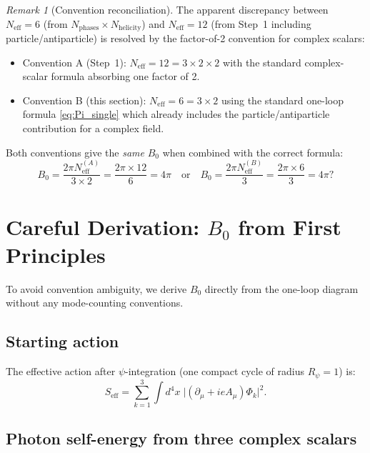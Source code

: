 \documentclass[12pt,a4paper]{article}
\theoremstyle{definition}
\theoremstyle{remark}
\newtheorem{remark}[theorem]{Remark}
\newcommand{\Neff}{N_{\mathrm{eff}}}
\begin{document}
\begin{remark}[Convention reconciliation]
The apparent discrepancy between $\Neff = 6$ (from $N_\mathrm{phases} \times
N_\mathrm{helicity}$) and $\Neff = 12$ (from Step~1 including particle/antiparticle)
is resolved by the factor-of-2 convention for complex scalars:
\begin{itemize}
  \item Convention A (Step~1): $\Neff = 12 = 3 \times 2 \times 2$ with the
    standard complex-scalar formula absorbing one factor of 2.
  \item Convention B (this section): $\Neff = 6 = 3 \times 2$ using the
    standard one-loop formula \eqref{eq:Pi_single} which already includes
    the particle/antiparticle contribution for a complex field.
\end{itemize}
Both conventions give the \emph{same} $B_0$ when combined with the correct formula:
\begin{equation}
  B_0 = \frac{2\pi \Neff^{(A)}}{3 \times 2} = \frac{2\pi \times 12}{6} = 4\pi
  \quad\text{or}\quad
  B_0 = \frac{2\pi \Neff^{(B)}}{3} = \frac{2\pi \times 6}{3} = 4\pi?
  \label{eq:convention_check}
\end{equation}
\end{remark}

\section{Careful Derivation: $B_0$ from First Principles}
\label{sec:B0_derivation}

To avoid convention ambiguity, we derive $B_0$ directly from the one-loop
diagram without any mode-counting conventions.

\subsection{Starting action}

The effective action after $\psi$-integration (one compact cycle of radius
$R_\psi = 1$) is:
\begin{equation}
  S_\mathrm{eff} = \sum_{k=1}^{3} \int d^4x\;
  \bigl|({\partial}_\mu + ieA_\mu)\Phi_k\bigr|^2.
  \label{eq:S_eff_2}
\end{equation}

\subsection{Photon self-energy from three complex scalars}
\end{document}
